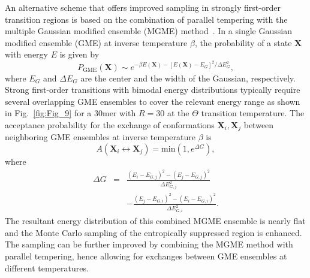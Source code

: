 \documentclass[12pt]{report}
\begin{document}
An alternative scheme that offers improved sampling in strongly first-order
transition regions is based on the combination of parallel tempering with
the
multiple Gaussian modified ensemble (MGME) 
method~\cite{Neuhaus2006}. In a single Gaussian modified ensemble
(GME)
at inverse temperature $\beta$, the probability of a state $\mathbf{X}$
with energy $E$ is given by
\begin{equation}
P_{\mathrm{GME}}(\mathbf{X}) \sim e^{-\beta E(\mathbf{X}) -
\left[E(\mathbf{X}) - E_{G}\right]^{2} / \Delta E_{G}^{2}},
\end{equation}
where $E_G$ and $\Delta E_G$ are the center and the width of the
Gaussian, respectively. 
Strong first-order transitions with bimodal energy distributions typically
require several overlapping GME ensembles to cover the relevant energy
range
as shown in Fig.~\ref{fig:Fig_9} for a 30mer with $R=30$ at
the $\Theta$ transition temperature. The acceptance probability for the
exchange of
conformations $\mathbf{X}_{i} , \mathbf{X}_{j}$ between neighboring GME
ensembles at inverse temperature $\beta$ is
\begin{equation}
A\left(\mathbf{X}_{i} \leftrightarrow \mathbf{X}_{j}\right) = 	
\mathrm{min}\left(1,e^{\Delta G}\right),
\end{equation}
where
\begin{eqnarray}
\Delta G  &=& 
\frac{\left(E_{i} - E_{G,j}\right)^{2}-\left(E_{j}-
E_{G,j}\right)^{2}}{\Delta E_{G,j}^{2}}  \nonumber \\
&&- \frac{\left(E_{j} - 	
E_{G,i}\right)^{2}-\left(E_{i} - E_{G,i}\right)^{2}}{\Delta E_{G,i}^{2}}.
\end{eqnarray}
The resultant energy distribution of this combined MGME ensemble is nearly
flat and the Monte Carlo sampling of the entropically suppressed region is
enhanced. The sampling can be further improved by combining the MGME method
with parallel tempering, hence allowing for exchanges between GME ensembles
at
different temperatures. 
\end{document}
